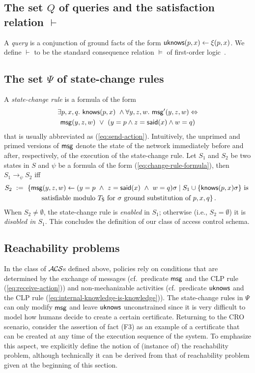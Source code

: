 \documentclass[conference]{llncs}
\newcommand{\know}{\ensuremath \mathsf{knows}}
\newcommand{\msg}{\ensuremath \mathsf{msg}}
\newcommand{\knowzero}{\ensuremath \mathsf{uknows}}
\newcommand{\said}{\ensuremath \mathsf{said}}
\newcommand{\CRO}{CRO}
\newcommand{\acs}{\ensuremath \mathcal{ACS}}
\begin{document}
\subsection{The set $Q$ of queries and the satisfaction relation $\vdash$}
\label{subsec:setofqueries}
A \emph{query} is a conjunction of ground facts of the form
$\knowzero(p,x)\leftarrow \xi(p,x)$. We define $\vdash$ to be the
standard consequence relation $\models$ of first-order
logic~\cite{enderton}.

\subsection{The set $\Psi$ of state-change rules} 
\label{subset:setofstatechangerules}
A \emph{state-change
rule} is a formula of the form
\begin{multline}
  \label{eq:change-rule-formula}
  \exists p,x,q. \
    \know(p,x)\ \wedge 
    \forall y,z,w.\ \msg'(y,z,w) \Leftrightarrow \\
      \msg(y,z,w) \ \vee \
      (y=p\wedge z=\said(x)\wedge w=q)
\end{multline}
that is usually abbreviated as (\ref{eq:send-action}).  Intuitively,
the unprimed and primed versions of $\msg$ denote the state of the
network immediately before and after, respectively, of the execution
of the state-change rule.  Let $S_1$ and $S_2$ be two states in $S$
and $\psi$ be a formula of the form (\ref{eq:change-rule-formula}),
then $S_1\rightarrow_{\psi} S_2$ iff
\begin{multline*}
  S_2 \ := \
  \{ 
  \msg(y,z,w) \leftarrow 
  (y=p \ \wedge \
    z=\said(x) \ \wedge \
    w=q)\sigma 
  \mid 
    S_1\cup \{ \know(p,x)\sigma \} \text{ is } \\
    \text{ satisfiable modulo $T_{\mathsf{S}}$ for } \sigma   
    \text{ ground substitution of } p,x,q 
\}\,.
\end{multline*}
When $S_2\neq \emptyset$, the state-change rule is \emph{enabled} in
$S_1$; otherwise (i.e., $S_2= \emptyset$) it is \emph{disabled in
  $S_1$}.  This concludes the definition of our class of access
control schema. 

\subsection{Reachability problems} 
In the class of $\acs$s defined above, 
policies rely on conditions that are
determined by the exchange of messages (cf.\ predicate $\msg$ and the
CLP rule (\ref{eq:receive-action})) and non-mechanizable activities
(cf.\ predicate $\knowzero$ and the CLP rule
(\ref{eq:internal-knowledge-is-knowledge})). The state-change rules in
$\Psi$ can only modify $\msg$ and leave $\knowzero$ unconstrained since
it is very difficult to model how humans decide to
create a certain certificate. 
Returning to the \CRO{} scenario, consider the assertion of fact (F3) as an example of
a certificate that can be created at any time of the execution sequence of the system. 
To emphasize this aspect, we explicitly define the notion of (instance of)  the reachability problem, although technically it can be derived from that of  reachability problem given at the beginning of this
section.
\end{document}
